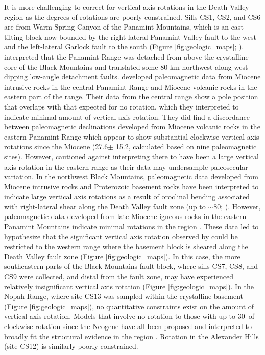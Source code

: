 It is more challenging to correct for vertical axis rotations in the Death Valley region as the degrees of rotations are poorly constrained. Sills CS1, CS2, and CS6 are from Warm Spring Canyon of the Panamint Mountains, which is an east-tilting block now bounded by the right-lateral Panamint Valley fault to the west and the left-lateral Garlock fault to the south (Figure \ref{fig:geologic_maps}; \cite{Snow1989a, Snow2000a}). \cite{Stewart1983a} interpreted that the Panamint Range was detached from above the crystalline core of the Black Mountains and translated some 80 km northwest along west dipping low-angle detachment faults. \cite{Petronis2002a} developed paleomagnetic data from Miocene intrusive rocks in the central Panamint Range and Miocene volcanic rocks in the eastern part of the range. Their data from the central range show a pole position that overlaps with that expected for no rotation, which they interpreted to indicate minimal amount of vertical axis rotation. They did find a discordance between paleomagnetic declinations developed from Miocene volcanic rocks in the eastern Panamint Range which appear to show substantial clockwise vertical axis rotations since the Miocene (27.6\textdegree $\pm$ 15.2\textdegree, calculated based on nine paleomagnetic sites). However, \cite{Petronis2002a} cautioned against interpreting there to have been a large vertical axis rotation in the eastern range as their data may undersample paleosecular variation. In the northwest Black Mountains, paleomagnetic data developed from Miocene intrusive rocks and Proterozoic basement rocks have been interpreted to indicate large vertical axis rotations as a result of oroclinal bending associated with right-lateral shear along the Death Valley fault zone (up to $\sim$80\textdegree; \cite{Holm1993a}). However, paleomagnetic data developed from late Miocene igneous rocks in the eastern Panamint Mountains indicate minimal rotations in the region \citep{Petronis2002a}. These data led \cite{Petronis2002a} to hypothesize that the significant vertical axis rotation observed by \cite{Holm1993a} could be restricted to the western range where the basement block is sheared along the Death Valley fault zone (Figure \ref{fig:geologic_maps}). In this case, the more southeastern parts of the Black Mountains fault block, where sills CS7, CS8, and CS9 were collected, and distal from the fault zone, may have experienced relatively insignificant vertical axis rotation (Figure \ref{fig:geologic_maps}). In the Nopah Range, where site CS13 was sampled within the crystalline basement (Figure \ref{fig:geologic_maps}), no quantitative constraints exist on the amount of vertical axis rotation. Models that involve no rotation to those with up to 30\textdegree\ of clockwise rotation since the Neogene have all been proposed and interpreted to broadly fit the structural evidence in the region \cite[e.g.][]{Serpa1996a, Pavlis2014a}. Rotation in the Alexander Hills (site CS12) is similarly poorly constrained. 

